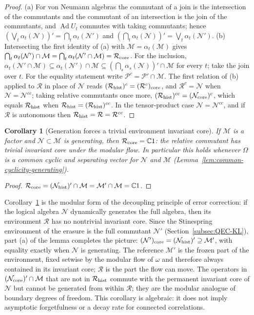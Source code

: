 \documentclass[a4paper,11pt]{article}
\newtheorem{corollary}[theorem]{Corollary}
\theoremstyle{definition}
\newcommand{\mR}{\mathcal{R}}
\newcommand{\mN}{\mathcal{N}}
\newcommand{\mM}{\mathcal{M}}
\begin{document}
\begin{proof}
(a) For von Neumann algebras the commutant of a join is the intersection of the commutants and the commutant of an intersection is the join of the commutants, and $\operatorname{Ad}U_t$ commutes with taking commutants; hence $(\bigvee_t\alpha_t(\mN))'=\bigcap_t\alpha_t(\mN')$ and $(\bigcap_t\alpha_t(\mN))'=\bigvee_t\alpha_t(\mN')$.
(b) Intersecting the first identity of (a) with $\mM=\alpha_t(\mM)$ gives $\bigcap_t\alpha_t(\mN')\cap\mM=\bigcap_t\alpha_t(\mN'\cap\mM)=\mR_{\rm core}$. For the inclusion, $\alpha_t(\mN'\cap\mM)\subseteq\alpha_t(\mN')\cap\mM\subseteq(\bigcap_s\alpha_s(\mN))'\cap\mM$ for every $t$; take the join over $t$. For the equality statement write $\mathcal P^c=\mathcal P'\cap\mM$. The first relation of (b) applied to $\mR$ in place of $\mN$ reads $(\mR_{\rm hist})^c=(\mR^c)_{\rm core}$, and $\mR^c=\mN$ when $\mN=\mN^{cc}$; taking relative commutants once more, $(\mR_{\rm hist})^{cc}=(\mN_{\rm core})^c$, which equals $\mR_{\rm hist}$ when $\mR_{\rm hist}=(\mR_{\rm hist})^{cc}$. In the tensor-product case $\mN=\mN^{cc}$, and if $\mR$ is autonomous then $\mR_{\rm hist}=\mR=\mR^{cc}$.
\end{proof}

\begin{corollary}[Generation forces a trivial environment invariant core]\label{cor:generating-forgetful}
If $\mM$ is a factor and $\mN\subset\mM$ is generating, then $\mR_{\rm core}=\mathbb C1$: the relative commutant has trivial invariant core under the modular flow. In particular this holds whenever $\Omega$ is a common cyclic and separating vector for $\mN$ and $\mM$ {\rm(Lemma~\ref{lem:common-cyclicity-generating})}.
\end{corollary}
\begin{proof}
$\mR_{\rm core}=(\mN_{\rm hist})'\cap\mM=\mM'\cap\mM=\mathbb C1$.
\end{proof}

Corollary~\ref{cor:generating-forgetful} is the modular form of the decoupling principle of error correction: if the logical algebra $\mN$ dynamically generates the full algebra, then its environment $\mR$ has no nontrivial invariant core. Since the Stinespring environment of the erasure is the full commutant $\mN'$ (Section~\ref{subsec:QEC-KL}), part (a) of the lemma completes the picture: $(\mN')_{\rm core}=(\mN_{\rm hist})'\supseteq\mM'$, with equality exactly when $\mN$ is generating. The reference $\mM'$ is the frozen part of the environment, fixed setwise by the modular flow of $\omega$ and therefore always contained in its invariant core; $\mR$ is the part the flow can move. The operators in $(\mN_{\rm core})'\cap\mM$ that are not in $\mR_{\rm hist}$ commute with the permanent invariant core of $\mN$ but cannot be generated from within $\mR$; they are the modular analogue of boundary degrees of freedom. This corollary is algebraic: it does not imply asymptotic forgetfulness or a decay rate for connected correlations.
\end{document}
